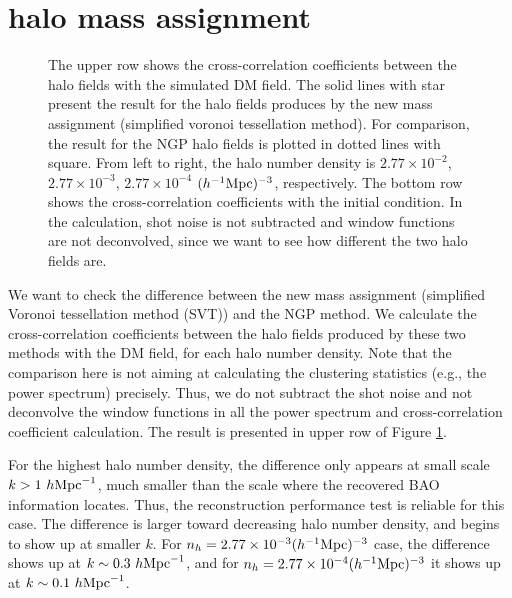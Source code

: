 \documentclass[iop]{emulateapj}
\newcommand{\mpch}{h^{-1} {\rm Mpc}}
\newcommand{\hmpc}{h {\rm Mpc}^{-1}}
\begin{document}
{\appendix
\section{halo mass assignment}

\begin{figure*}
\epsfxsize=18cm
\caption{The upper row shows the cross-correlation coefficients between the halo fields with the simulated DM field.
The solid lines with star present the result for the halo fields produces by the new mass assignment (simplified voronoi tessellation method).
For comparison, the result for the NGP halo fields is plotted in dotted lines with square.
From left to right, the halo number density is $2.77\times 10^{-2}$, $2.77\times 10^{-3}$, $2.77\times 10^{-4}$ $(\mpch)^{-3}$, respectively.
The bottom row shows the cross-correlation coefficients with the initial condition.
In the calculation, shot noise is not subtracted and window functions are not deconvolved,
since we want to see how different the two halo fields are.
}
\label{fig:cmpcc}
\end{figure*}

We want to check the difference between the new mass assignment (simplified Voronoi tessellation method (SVT)) and the NGP method.
We calculate the cross-correlation coefficients between the halo fields produced by these two methods with the DM field, for each halo number density.
Note that the comparison here is not aiming at calculating the clustering statistics (e.g., the power spectrum) precisely.
Thus, we do not subtract the shot noise and not deconvolve the window functions in all the power spectrum and cross-correlation coefficient calculation.
The result is presented in upper row of Figure \ref{fig:cmpcc}.


For the highest halo number density, the difference only appears at small scale $k>1\ \hmpc$,
 much smaller than the scale where the recovered BAO information locates.
Thus, the reconstruction performance test is reliable for this case.
The difference is larger toward decreasing halo number density, and begins to show up at smaller $k$.
For $n_h=2.77\times 10^{-3} (\mpch)^{-3}$ case, the difference shows up at $k\sim 0.3\ \hmpc$,
 and for $n_h=2.77\times 10^{-4} (\mpch)^{-3}$ it shows up at $k\sim 0.1\ \hmpc$.
 
}
\end{document}

